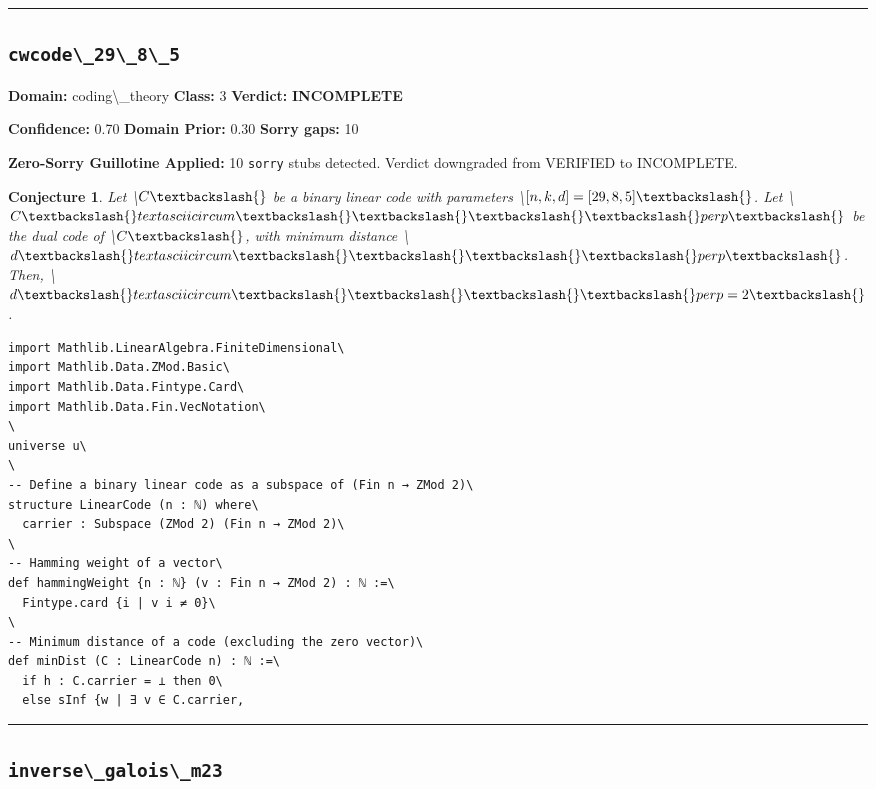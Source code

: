 \documentclass[12pt,a4paper]{article}
\newtheorem{conjecture}{Conjecture}
\begin{document}
\hrule\medskip

\subsection*{\texttt{cwcode\textbackslash{}_29\textbackslash{}_8\textbackslash{}_5}}

\textbf{Domain:} coding\textbackslash{}_theory \quad \textbf{Class:} 3 \quad \textbf{Verdict:} \textcolor{incompleteamber}{\textbf{INCOMPLETE}}

\textbf{Confidence:} 0.70 \quad \textbf{Domain Prior:} 0.30 \quad \textbf{Sorry gaps:} 10

\textcolor{sorryred}{\textbf{Zero-Sorry Guillotine Applied:} 10 \texttt{sorry} stubs detected. Verdict downgraded from VERIFIED to INCOMPLETE.}

\begin{conjecture}
Let \textbackslash{}$C\textbackslash{}$ be a binary linear code with parameters \textbackslash{}$[n, k, d] = [29, 8, 5]\textbackslash{}$. Let \textbackslash{}$C\textbackslash{}textasciicircum{}\textbackslash{}\textbackslash{}\textbackslash{}\textbackslash{}perp\textbackslash{}$ be the dual code of \textbackslash{}$C\textbackslash{}$, with minimum distance \textbackslash{}$d\textbackslash{}textasciicircum{}\textbackslash{}\textbackslash{}\textbackslash{}\textbackslash{}perp\textbackslash{}$. Then, \textbackslash{}$d\textbackslash{}textasciicircum{}\textbackslash{}\textbackslash{}\textbackslash{}\textbackslash{}perp = 2\textbackslash{}$.
\end{conjecture}

\begin{lstlisting}[caption={Lean 4 Sketch (v14 Galois)}]
import Mathlib.LinearAlgebra.FiniteDimensional\
import Mathlib.Data.ZMod.Basic\
import Mathlib.Data.Fintype.Card\
import Mathlib.Data.Fin.VecNotation\
\
universe u\
\
-- Define a binary linear code as a subspace of (Fin n → ZMod 2)\
structure LinearCode (n : ℕ) where\
  carrier : Subspace (ZMod 2) (Fin n → ZMod 2)\
\
-- Hamming weight of a vector\
def hammingWeight {n : ℕ} (v : Fin n → ZMod 2) : ℕ :=\
  Fintype.card {i | v i ≠ 0}\
\
-- Minimum distance of a code (excluding the zero vector)\
def minDist (C : LinearCode n) : ℕ :=\
  if h : C.carrier = ⊥ then 0\
  else sInf {w | ∃ v ∈ C.carrier, 
\end{lstlisting}

\hrule\medskip

\subsection*{\texttt{inverse\textbackslash{}_galois\textbackslash{}_m23}}
\end{document}
